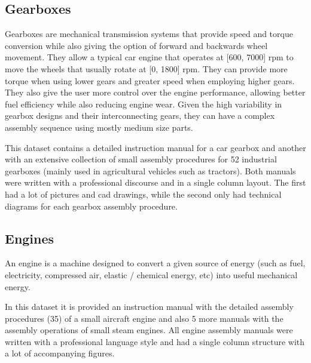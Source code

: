 \subsection{Gearboxes}

Gearboxes are mechanical transmission systems that provide speed and torque conversion while also giving the option of forward and backwards wheel movement. They allow a typical car engine that operates at [600, 7000] \gls{rpm} to move the wheels that usually rotate at [0, 1800] \gls{rpm}. They can provide more torque when using lower gears and greater speed when employing higher gears. They also give the user more control over the engine performance, allowing better fuel efficiency while also reducing engine wear. Given the high variability in gearbox designs and their interconnecting gears, they can have a complex assembly sequence using mostly medium size parts.

This dataset contains a detailed instruction manual for a car gearbox and another with an extensive collection of small assembly procedures for 52 industrial gearboxes (mainly used in agricultural vehicles such as tractors). Both manuals were written with a professional discourse and in a single column layout. The first had a lot of pictures and \gls{cad} drawings, while the second only had technical diagrams for each gearbox assembly procedure.


\subsection{Engines}

An engine is a machine designed to convert a given source of energy (such as fuel, electricity, compressed air, elastic / chemical energy, etc) into useful mechanical energy.

In this dataset it is provided an instruction manual with the detailed assembly procedures (35) of a small aircraft engine and also 5 more manuals with the assembly operations of small steam engines. All engine assembly manuals were written with a professional language style and had a single column structure with a lot of accompanying figures.


